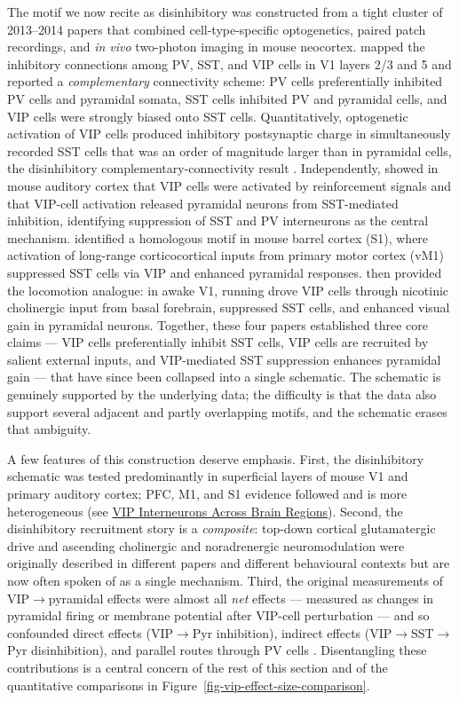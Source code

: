 \documentclass[11pt]{article}
\let\origrightarrow\rightarrow
\def\rightarrow{\ensuremath{\origrightarrow}}
\begin{document}
The motif we now recite as disinhibitory was constructed from a tight cluster of 2013--2014 papers that combined cell-type-specific optogenetics, paired patch recordings, and \textit{in vivo} two-photon imaging in mouse neocortex. \citet{Pfeffer2013} mapped the inhibitory connections among PV, SST, and VIP cells in V1 layers 2/3 and 5 and reported a \textit{complementary} connectivity scheme: PV cells preferentially inhibited PV cells and pyramidal somata, SST cells inhibited PV and pyramidal cells, and VIP cells were strongly biased onto SST cells. Quantitatively, optogenetic activation of VIP cells produced inhibitory postsynaptic charge in simultaneously recorded SST cells that was an order of magnitude larger than in pyramidal cells, the disinhibitory complementary-connectivity result \citep{Pfeffer2013}. Independently, \citet{Pi2013} showed in mouse auditory cortex that VIP cells were activated by reinforcement signals and that VIP-cell activation released pyramidal neurons from SST-mediated inhibition, identifying suppression of SST and PV interneurons as the central mechanism. \citet{Lee2013} identified a homologous motif in mouse barrel cortex (S1), where activation of long-range corticocortical inputs from primary motor cortex (vM1) suppressed SST cells via VIP and enhanced pyramidal responses. \citet{Fu2014} then provided the locomotion analogue: in awake V1, running drove VIP cells through nicotinic cholinergic input from basal forebrain, suppressed SST cells, and enhanced visual gain in pyramidal neurons. Together, these four papers established three core claims --- VIP cells preferentially inhibit SST cells, VIP cells are recruited by salient external inputs, and VIP-mediated SST suppression enhances pyramidal gain --- that have since been collapsed into a single schematic. The schematic is genuinely supported by the underlying data; the difficulty is that the data also support several adjacent and partly overlapping motifs, and the schematic erases that ambiguity.

A few features of this construction deserve emphasis. First, the disinhibitory schematic was tested predominantly in superficial layers of mouse V1 and primary auditory cortex; PFC, M1, and S1 evidence followed and is more heterogeneous (see \href{/cross-areas}{VIP Interneurons Across Brain Regions}). Second, the disinhibitory recruitment story is a \textit{composite}: top-down cortical glutamatergic drive \citep{Lee2013, Zhang2014} and ascending cholinergic and noradrenergic neuromodulation \citep{Fu2014, Hangya2015, Kuchibhotla2017} were originally described in different papers and different behavioural contexts but are now often spoken of as a single mechanism. Third, the original measurements of VIP\rightarrow pyramidal effects were almost all \textit{net} effects --- measured as changes in pyramidal firing or membrane potential after VIP-cell perturbation --- and so confounded direct effects (VIP\rightarrow Pyr inhibition), indirect effects (VIP\rightarrow SST\rightarrow Pyr disinhibition), and parallel routes through PV cells \citep{Karnani2016a, Karnani2016b, Yu2019}. Disentangling these contributions is a central concern of the rest of this section and of the quantitative comparisons in Figure~\ref{fig-vip-effect-size-comparison}.
\end{document}
